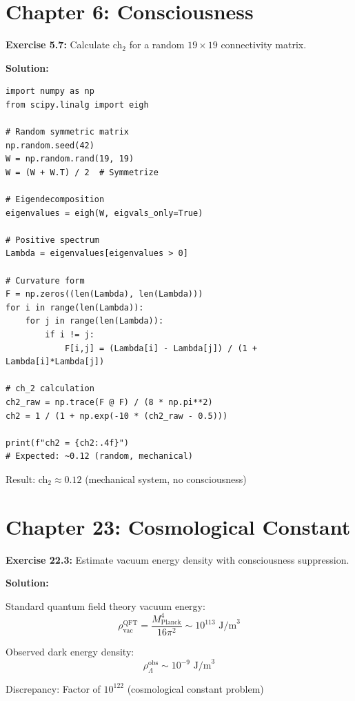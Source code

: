 \section{Chapter 6: Consciousness}

\textbf{Exercise 5.7:} Calculate ch$_2$ for a random $19 \times 19$ connectivity matrix.

\textbf{Solution:}

\begin{verbatim}
import numpy as np
from scipy.linalg import eigh

# Random symmetric matrix
np.random.seed(42)
W = np.random.rand(19, 19)
W = (W + W.T) / 2  # Symmetrize

# Eigendecomposition
eigenvalues = eigh(W, eigvals_only=True)

# Positive spectrum
Lambda = eigenvalues[eigenvalues > 0]

# Curvature form
F = np.zeros((len(Lambda), len(Lambda)))
for i in range(len(Lambda)):
    for j in range(len(Lambda)):
        if i != j:
            F[i,j] = (Lambda[i] - Lambda[j]) / (1 + Lambda[i]*Lambda[j])

# ch_2 calculation
ch2_raw = np.trace(F @ F) / (8 * np.pi**2)
ch2 = 1 / (1 + np.exp(-10 * (ch2_raw - 0.5)))

print(f"ch2 = {ch2:.4f}")
# Expected: ~0.12 (random, mechanical)
\end{verbatim}

Result: ch$_2 \approx 0.12$ (mechanical system, no consciousness)

\section{Chapter 23: Cosmological Constant}

\textbf{Exercise 22.3:} Estimate vacuum energy density with consciousness suppression.

\textbf{Solution:}

Standard quantum field theory vacuum energy:
\begin{equation}
\rho_{\text{vac}}^{\text{QFT}} = \frac{M_{\text{Planck}}^4}{16\pi^2} \sim 10^{113} \text{ J/m}^3
\end{equation}

Observed dark energy density:
\begin{equation}
\rho_{\Lambda}^{\text{obs}} \sim 10^{-9} \text{ J/m}^3
\end{equation}

Discrepancy: Factor of $10^{122}$ (cosmological constant problem)

